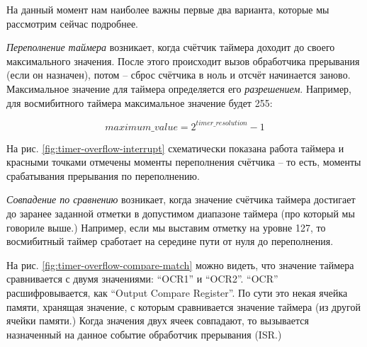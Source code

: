 \documentclass[../sparc.tex]{subfiles}
\begin{document}
На данный момент нам наиболее важны первые два варианта, которые мы рассмотрим
сейчас подробнее.


\emph{Переполнение таймера} возникает, когда счётчик таймера доходит до своего
максимального значения.  После этого происходит вызов обработчика прерывания
(если он назначен), потом -- сброс счётчика в ноль и отсчёт начинается заново.
Максимальное значение для таймера определяется его \emph{разрешением}.
Например, для восмибитного таймера максимальное значение будет 255:

\begin{equation}
  maximum\_value = 2^{timer\_resolution} - 1
\end{equation}

На рис. \ref{fig:timer-overflow-interrupt} схематически показана работа таймера
и красными точками отмечены моменты переполнения счётчика -- то есть, моменты
срабатывания прерывания по переполнению.

\emph{Совпадение по сравнению} возникает, когда значение счётчика таймера
достигает до заранее заданной отметки в допустимом диапазоне таймера (про
который мы говориле выше.)  Например, если мы выставим отметку на уровне 127, то
восмибитный таймер сработает на середине пути от нуля до переполнения.


На рис. \ref{fig:timer-overflow-compare-match} можно видеть, что значение
таймера сравнивается с двумя значениями: ``OCR1'' и ``OCR2''. ``OCR''
расшифровывается, как ``Output Compare Register''.  По сути это некая ячейка
памяти, хранящая значение, с которым сравнивается значение таймера (из другой
ячейки памяти.)  Когда значения двух ячеек совпадают, то вызывается назначенный
на данное событие обработчик прерывания (\gls{ISR}.)
\end{document}

